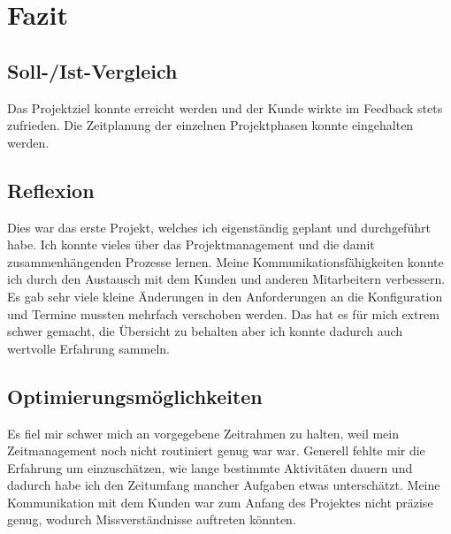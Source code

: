 \section{Fazit} 
\label{sec:Fazit}

\subsection{Soll-/Ist-Vergleich}
\label{sec:SollIstVergleich}
Das Projektziel konnte erreicht werden und der Kunde wirkte im Feedback stets zufrieden. Die Zeitplanung der einzelnen Projektphasen konnte eingehalten werden. 

\subsection{Reflexion}
\label{sec:Reflexion}
Dies war das erste Projekt, welches ich eigenständig geplant und durchgeführt habe. Ich konnte vieles über das Projektmanagement und die damit zusammenhängenden Prozesse lernen. Meine Kommunikationsfähigkeiten konnte ich durch den Austausch mit dem Kunden und anderen Mitarbeitern verbessern. Es gab sehr viele kleine Änderungen in den Anforderungen an die Konfiguration und Termine mussten mehrfach verschoben werden. Das hat es für mich extrem schwer gemacht, die Übersicht zu behalten aber ich konnte dadurch auch wertvolle Erfahrung sammeln.
\begin{comment}
	\item Was hat der Prüfling bei der Durchführung des Projekts gelernt (\zB Zeitplanung, Vorteile der eingesetzten Frameworks, Änderungen der Anforderungen)?
\end{comment}
\subsection{Optimierungsmöglichkeiten}
\label{sec:Optimierungsmöglichkeiten}
Es fiel mir schwer mich an vorgegebene Zeitrahmen zu halten, weil mein Zeitmanagement noch nicht routiniert genug war war. Generell fehlte mir die Erfahrung um einzuschätzen, wie lange bestimmte Aktivitäten dauern und dadurch habe ich den Zeitumfang mancher Aufgaben etwas unterschätzt. Meine Kommunikation mit dem Kunden war zum Anfang des Projektes nicht präzise genug, wodurch Missverständnisse auftreten könnten.



